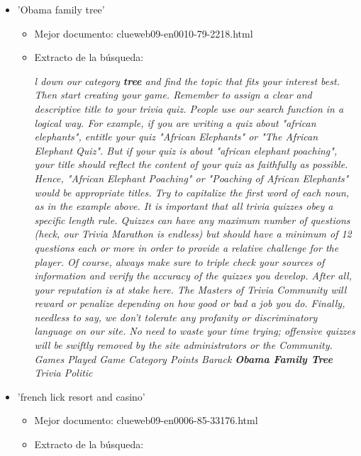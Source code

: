\documentclass[palatino,nochap]{apuntes}
\begin{document}
\begin{itemize}
	\item 'Obama family tree'
	\begin{itemize}
		\item Mejor documento: clueweb09-en0010-79-2218.html
		\item Extracto de la búsqueda:
		
		\textit{l down our category \textbf{tree} and find the topic that fits your interest best. Then start creating your game. Remember to assign a clear and descriptive title to your trivia quiz. People use our search function in a logical way. For example, if you are writing a quiz about "african elephants", entitle your quiz "African Elephants" or "The African Elephant Quiz". But if your quiz is about "african elephant poaching", your title should reflect the content of your quiz as faithfully as possible. Hence, "African Elephant Poaching" or "Poaching of African Elephants" would be appropriate titles. Try to capitalize the first word of each noun, as in the example above. It is important that all trivia quizzes obey a specific length rule. Quizzes can have any maximum number of questions (heck, our Trivia Marathon is endless) but should have a minimum of 12 questions each or more in order to provide a relative challenge for the player. Of course, always make sure to triple check your sources of information and verify the accuracy of the quizzes you develop. After all, your reputation is at stake here. The Masters of Trivia Community will reward or penalize depending on how good or bad a job you do. Finally, needless to say, we don't tolerate any profanity or discriminatory language on our site. No need to waste your time trying; offensive quizzes will be swiftly removed by the site administrators or the Community. Games Played Game Category Points Barack \textbf{Obama Family Tree} Trivia Politic}
	\end{itemize}
	\item 'french lick resort and casino'
	\begin{itemize}
		\item Mejor documento: clueweb09-en0006-85-33176.html
		\item Extracto de la búsqueda:
		

\end{itemize}
\end{itemize}
\end{document}
